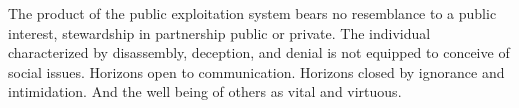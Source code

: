 

The product of the public exploitation system bears no resemblance to
a public interest, stewardship in partnership public or private.  The
individual characterized by disassembly, deception, and denial is not
equipped to conceive of social issues.  Horizons open to
communication.  Horizons closed by ignorance and intimidation.  And
the well being of others as vital and virtuous.

\bye
